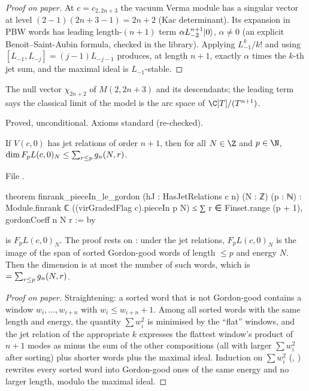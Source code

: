 \begin{proof}[Proof on paper]
At $c=c_{2,2n+3}$ the vacuum Verma module has a singular vector at level $(2-1)(2n+3-1)=2n+2$ (Kac determinant). Its
expansion in PBW words has leading length-$(n+1)$ term $\alpha L_{-2}^{n+1}|0\rangle$, $\alpha\ne0$ (an explicit
Benoit--Saint-Aubin formula, checked in the library). Applying $L_{-1}^k/k!$ and using $[L_{-1},L_{-j}]=(j-1)L_{-j-1}$
produces, at length $n+1$, exactly $\alpha$ times the $k$-th jet sum, and the maximal ideal is $L_{-1}$-stable.
\end{proof}

\begin{physics}
The null vector $\chi_{2n+2}$ of $M(2,2n+3)$ and its descendants; the leading term says the classical limit of the
model is the arc space of $\C[T]/(T^{n+1})$.
\end{physics}

\begin{status}
Proved, unconditional. Axioms standard (re-checked).
\end{status}

\begin{theorem}\label{l29:thm:upper}
If $V(c,0)$ has jet relations of order $n+1$, then for all $N\in\Z$ and $p\in\N$,
$\dim F_pL(c,0)_N\le\sum_{r\le p}g_n(N,r)$.
\end{theorem}

\noindent File .
\begin{leancode}
theorem finrank_pieceIn_le_gordon (hJ : HasJetRelations c n) (N : ℤ) (p : ℕ) :
    Module.finrank ℂ ((virGradedFlag c).pieceIn p N) ≤
      ∑ r ∈ Finset.range (p + 1), gordonCoeff n N r := by
\end{leancode}

\begin{dictionary}
 is $F_pL(c,0)_N$. The proof rests on : under the jet
relations, $F_pL(c,0)_N$ is the image of the span of sorted Gordon-good words of length $\le p$ and energy $N$. Then
the dimension is at most the number of such words, which is  $=\sum_{r\le p}g_n(N,r)$.
\end{dictionary}

\begin{proof}[Proof on paper]
Straightening: a sorted word that is not Gordon-good contains a window $w_i,\dots,w_{i+n}$ with $w_i\le w_{i+n}+1$.
Among all sorted words with the same length and energy, the quantity $\sum w_i^2$ is minimised by the ``flat''
windows, and the jet relation of the appropriate $k$ expresses the flattest window's product of $n+1$ modes as minus
the sum of the other compositions (all with larger $\sum w_i^2$ after sorting) plus shorter words plus the maximal
ideal. Induction on $\sum w_i^2$ (, ) rewrites every sorted word into
Gordon-good ones of the same energy and no larger length, modulo the maximal ideal.
\end{proof}

